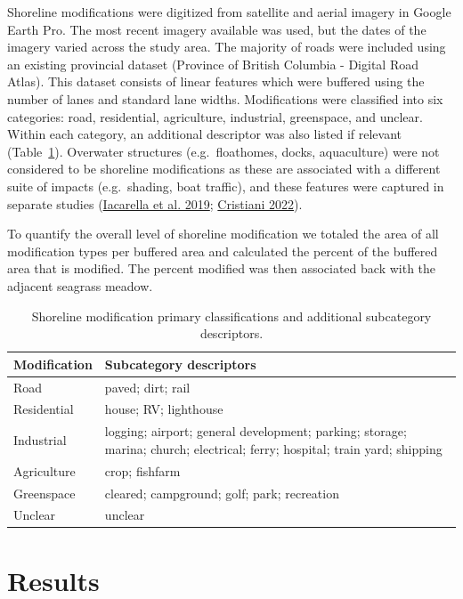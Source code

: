 \documentclass[12pt]{article}\usepackage[]{graphicx}\usepackage[]{color}
\begin{document}
Shoreline modifications were digitized from satellite and aerial imagery in Google Earth Pro. The most recent imagery available was used, but the dates of the imagery varied across the study area. The majority of roads were included using an existing provincial dataset (Province of British Columbia - Digital Road Atlas). This dataset consists of linear features which were buffered using the number of lanes and standard lane widths. Modifications were classified into six categories: road, residential, agriculture, industrial, greenspace, and unclear. Within each category, an additional descriptor was also listed if relevant (Table~\ref{tab:modifications}). Overwater structures (e.g.~floathomes, docks, aquaculture) were not considered to be shoreline modifications as these are associated with a different suite of impacts (e.g.~shading, boat traffic), and these features were captured in separate studies (\protect\hyperlink{ref-Iacarella2019}{Iacarella et al. 2019}; \protect\hyperlink{ref-cristiani2022}{Cristiani 2022}).

To quantify the overall level of shoreline modification we totaled the area of all modification types per buffered area and calculated the percent of the buffered area that is modified. The percent modified was then associated back with the adjacent seagrass meadow.
\begin{table}[h]

\caption{\label{tab:modifications}Shoreline modification primary classifications and additional subcategory descriptors.}
\centering
\fontsize{9}{11}\selectfont
\begin{tabular}[t]{>{\centering\arraybackslash}m{10em}>{\raggedright\arraybackslash}m{30em}}
\toprule
\textbf{Modification} & \textbf{Subcategory descriptors}\\
\midrule
Road & paved; dirt; rail\\
\addlinespace
Residential & house; RV; lighthouse\\
\addlinespace
Industrial & logging; airport; general development; parking; storage; marina; church; electrical; ferry; hospital; train yard; shipping\\
\addlinespace
Agriculture & crop; fishfarm\\
\addlinespace
Greenspace & cleared; campground; golf; park; recreation\\
\addlinespace
Unclear & unclear\\
\bottomrule
\end{tabular}
\end{table}
\hypertarget{results}{%
\section{Results}\label{results}}
\end{document}
